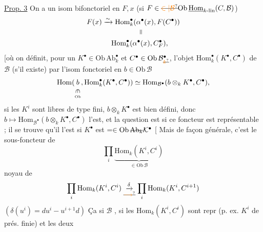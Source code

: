 \uline{Prop. 3} On a un isom bifonctoriel en $F,x$
(si $F\in\deleted{\unsure{\in|\mathcal B}}\mathrm{Ob}\,\underline{\mathrm{Hom}}_{k\text{-}\mathrm{lin}}(C,\mathcal B)$)
\[
\begin{aligned}
 F(x)&\xrightarrow{\sim}\mathrm{Hom}_k^\bullet(\alpha^\bullet(x),F(C^\bullet))\\
 &\hspace{5.3em}\rotatebox{90}{$=$}\\
 &\hspace{1.3em}\mathrm{Hom}_k^\bullet(\alpha^\bullet(x),C_F^\bullet),
\end{aligned}
\]
[où on définit, pour un $K^\bullet\in\mathrm{Ob}\,\mathrm{Ab}_k^\bullet$
et $C^\bullet\in\mathrm{Ob}\,\mathcal B^\bullet_{\deleted{\unsure{k}}}$,
l'objet $\mathrm{Hom}_k^\bullet(K^\bullet,C^\bullet)$ de $\mathcal B$
(s'il existe) par l'isom fonctoriel en $b\in\mathrm{Ob}\,\mathcal B$
\[
 \mathrm{Hom}(\underset{\underset{\mathrm{Ob}}{\rotatebox{-90}{$\in$}}}{b},
 \mathrm{Hom}_k^\bullet(K^\bullet,C^\bullet))
 \simeq\mathrm{Hom}_{\mathcal B^\bullet}(b\otimes_k K^\bullet,C^\bullet),
\]
si les $K^i$ sont libres de type fini, $b\otimes_k K^\bullet$
est bien défini, donc $b\longmapsto\mathrm{Hom}_{\mathcal B^\bullet}(b\otimes_k K^\bullet,C^\bullet)$
l'est, et la question est si ce foncteur est représentable ; il se trouve qu'il l'est si
$K^\bullet$ est  $=\in\mathrm{Ob}\,\deleted{\mathrm{Ab}_k}\mathcal K^\bullet$
[ Mais de façon générale, c'est le sous-foncteur de
\[
 \prod_i\underbrace{\mathrm{Hom}_k(K^i,C^i)}_{\in\mathrm{Ob}\,\mathcal B}
\]
noyau de
\[
 \prod_i\mathrm{Hom}_k(K^i,C^i)\mathrel{\underset{\deleted{\unsure{\longrightarrow}}}{\xrightarrow{\delta}}}\prod_i\mathrm{Hom}_k(K^i,C^{i+1})
\]
$(\delta(u^i)=du^i-u^{i+1}d)$  Ça  si
$\mathcal B$  ,
si les $\mathrm{Hom}_k(K^i,C^i)$ sont repr (p. ex.  $K^i$ de prés. finie) et les deux
